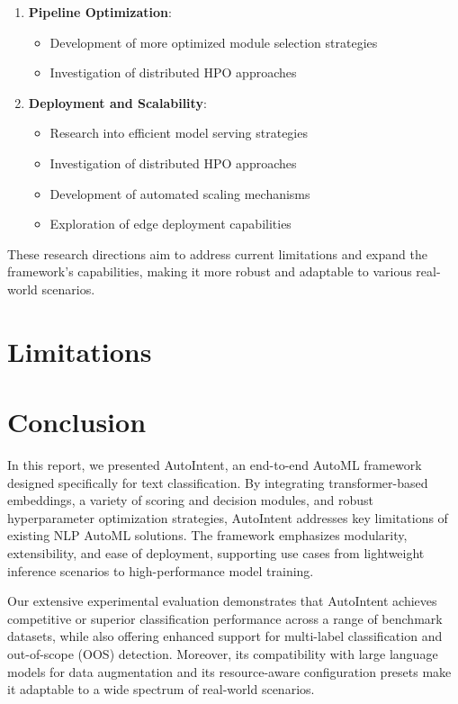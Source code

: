 \begin{enumerate}
    \item \textbf{Pipeline Optimization}:
    \begin{itemize}
        \item Development of more optimized module selection strategies
        \item Investigation of distributed HPO approaches
    \end{itemize}
    
    \item \textbf{Deployment and Scalability}:
    \begin{itemize}
        \item Research into efficient model serving strategies
        \item Investigation of distributed HPO approaches
        \item Development of automated scaling mechanisms
        \item Exploration of edge deployment capabilities
    \end{itemize}
\end{enumerate}

These research directions aim to address current limitations and expand the framework's capabilities, making it more robust and adaptable to various real-world scenarios.

\section{Limitations}

\section{Conclusion}

In this report, we presented AutoIntent, an end-to-end AutoML framework designed specifically for text classification. By integrating transformer-based embeddings, a variety of scoring and decision modules, and robust hyperparameter optimization strategies, AutoIntent addresses key limitations of existing NLP AutoML solutions. The framework emphasizes modularity, extensibility, and ease of deployment, supporting use cases from lightweight inference scenarios to high-performance model training.

Our extensive experimental evaluation demonstrates that AutoIntent achieves competitive or superior classification performance across a range of benchmark datasets, while also offering enhanced support for multi-label classification and out-of-scope (OOS) detection. Moreover, its compatibility with large language models for data augmentation and its resource-aware configuration presets make it adaptable to a wide spectrum of real-world scenarios.

